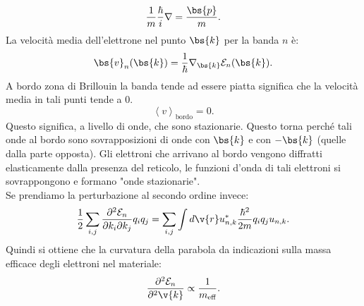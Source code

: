 \[
	\frac{1}{m} \frac{\hbar }{i}\nabla  = \frac{\bs{p}}{m}
.\]
La velocità media dell'elettrone nel punto $\bs{k}$ per la banda $n$ è:
\[
	\bs{v}_n(\bs{k}) =
	\frac{1}{\hbar } \nabla_{\bs{k}} \mathcal{E}_n (\bs{k})
.\] 
A bordo zona di Brillouin la banda tende ad essere piatta significa che la velocità media in tali punti tende a 0. 
\[
	\left< v \right>_\text{bordo} = 0
.\] 
Questo significa, a livello di onde, che sono stazionarie. Questo torna perché tali onde al bordo sono sovrapposizioni di onde con $\bs{k}$ e con $-\bs{k}$ (quelle dalla parte opposta). Gli elettroni che arrivano al bordo vengono diffratti elasticamente dalla presenza del reticolo, le funzioni d'onda di tali elettroni si sovrappongono e formano "onde stazionarie".\\
Se prendiamo la perturbazione al secondo ordine invece:
\[
    \frac{1}{2}\sum_{i,j}^{} \frac{\partial ^2 \mathcal{E}_n}{\partial k_i \partial k_j} q_iq_j 
    =
    \sum_{i,j}^{} \int d\v{r}u^*_{n,k}\frac{\hbar ^2}{2m}q_iq_ju_{n,k}
.\] 
Quindi si ottiene che la curvatura della parabola da indicazioni sulla massa efficace degli elettroni nel materiale:
\[
    \frac{\partial ^2\mathcal{E}_n}{\partial ^2\v{k}} \propto  \frac{1}{m_\text{eff} }
.\] 
